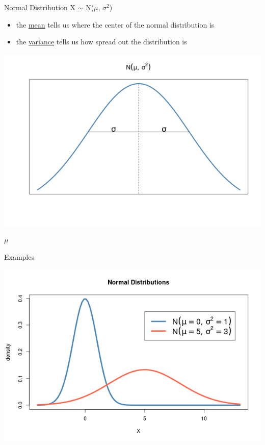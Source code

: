 \documentclass{beamer}
\begin{document}
\begin{frame}{Normal Distribution}
X $\sim$ N($\mu$, $\sigma^2$)
\begin{itemize}
    \item the \underline{mean} tells us where the center of the normal distribution is
    \item the \underline{variance} tells us how spread out the distribution is
\end{itemize}
\begin{center}
    \includegraphics[scale=.4]{img/normal_pars.png}
    \vspace{-12mm}
    
    \hspace{2.5mm}$\mu$
\end{center}
\end{frame}

\begin{frame}{Examples}
\begin{center}
    \includegraphics[scale=.55]{img/two_normals.png}
\end{center}
\end{frame}
\end{document}
